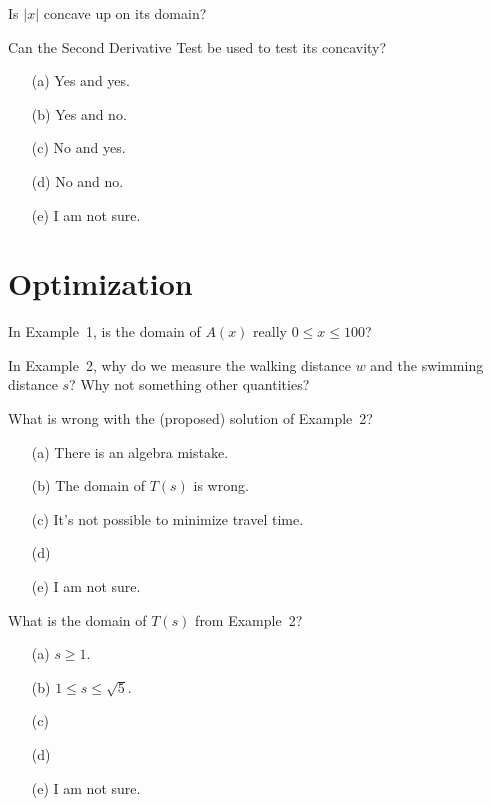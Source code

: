 \documentclass[14pt]{beamer}
\begin{document}
\begin{frame}[t]
  Is \(|x|\) concave up on its domain? 

  Can the Second Derivative Test be used to test its concavity?

  \medskip
  \begin{itemize} \setlength\itemsep{1ex}
    \item[(a)] Yes and yes.
    \item[(b)] Yes and no.
    \item[(c)] No and yes.
    \item[(d)] No and no.
    \item[(e)] I am not sure.
  \end{itemize} 
\end{frame}

\section{Optimization}
\begin{frame}[c]
  In Example~1, is the domain of \(A(x)\) really \(0 \le x \le 100\)?
\end{frame}

\begin{frame}[c]
  In Example~2, why do we measure the walking distance \(w\) and the swimming distance \(s\)? Why not something other quantities?
\end{frame}

\begin{frame}[t]
  What is wrong with the (proposed) solution of Example~2?

  \medskip
  \begin{itemize} \setlength\itemsep{1ex}
    \item[(a)] There is an algebra mistake.
    \item[(b)] The domain of \(T(s)\) is wrong.
    \item[(c)] It's not possible to minimize travel time.
    \item[(d)] 
    \item[(e)] I am not sure.
  \end{itemize} 
\end{frame}

\begin{frame}[t]
  What is the domain of \(T(s)\) from Example~2?

  \medskip
  \begin{itemize} \setlength\itemsep{1ex}
    \item[(a)] \(s \ge 1\). 
    \item[(b)] \(1 \le s \le \sqrt{5}\). 
    \item[(c)] 
    \item[(d)] 
    \item[(e)] I am not sure.
  \end{itemize} 
\end{frame}
\end{document}

